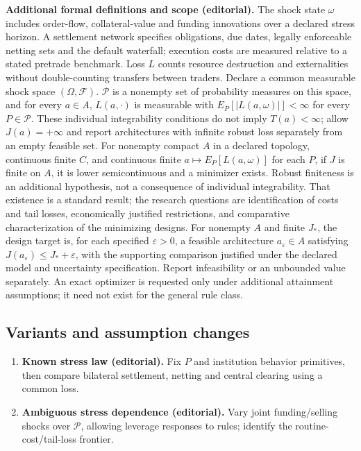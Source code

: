\documentclass[11pt,a4paper]{article}
\begin{document}
\textbf{Additional formal definitions and scope (editorial).} The shock state \(\omega\) includes order-flow, collateral-value and funding innovations over a declared stress horizon. A settlement network specifies obligations, due dates, legally enforceable netting sets and the default waterfall; execution costs are measured relative to a stated pretrade benchmark. Loss \(L\) counts resource destruction and externalities without double-counting transfers between traders. Declare a common measurable shock space \((\Omega,\mathcal F)\). \(\mathcal P\) is a nonempty set of probability measures on this space, and for every \(a\in A\), \(L(a,\cdot)\) is measurable with \(E_P[|L(a,\omega)|]<\infty\) for every \(P\in\mathcal P\). These individual integrability conditions do not imply \(T(a)<\infty\); allow \(J(a)=+\infty\) and report architectures with infinite robust loss separately from an empty feasible set. For nonempty compact \(A\) in a declared topology, continuous finite \(C\), and continuous finite \(a\mapsto E_P[L(a,\omega)]\) for each \(P\), if \(J\) is finite on \(A\), it is lower semicontinuous and a minimizer exists. Robust finiteness is an additional hypothesis, not a consequence of individual integrability. That existence is a standard result; the research questions are identification of costs and tail losses, economically justified restrictions, and comparative characterization of the minimizing designs. For nonempty \(A\) and finite \(J_*\), the design target is, for each specified \(\varepsilon>0\), a feasible architecture \(a_\varepsilon\in A\) satisfying \(J(a_\varepsilon)\leq J_*+\varepsilon\), with the supporting comparison justified under the declared model and uncertainty specification. Report infeasibility or an unbounded value separately. An exact optimizer is requested only under additional attainment assumptions; it need not exist for the general rule class.
\subsection*{Variants and assumption changes}
\begin{enumerate}
\item \textbf{Known stress law (editorial).} Fix \(P\) and institution behavior primitives, then compare bilateral settlement, netting and central clearing using a common loss.
\item \textbf{Ambiguous stress dependence (editorial).} Vary joint funding/selling shocks over \(\mathcal P\), allowing leverage responses to rules; identify the routine-cost/tail-loss frontier.
\end{enumerate}
\end{document}
